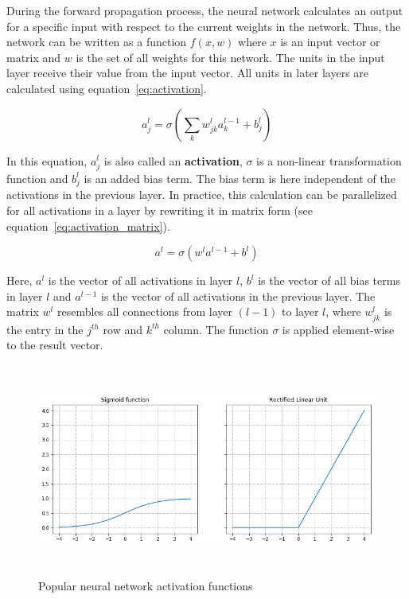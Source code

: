 During the forward propagation process, the neural network calculates an output
for a specific input with respect to the current weights in the network.
Thus, the network can be written as a function $f(x,w)$ where $x$ is an input
vector or matrix and $w$ is the set of all weights for this network.
The units in the input layer receive their value from the input vector.
All units in later layers are calculated using equation~\ref{eq:activation}.

\begin{equation}
  \label{eq:activation}
  a_j^l = \sigma(\sum_k w_{jk}^l a_k^{l-1} + b_j^l)
\end{equation}

In this equation, $a_j^l$ is also called an \textbf{activation}, $\sigma$ is a
non-linear transformation function and $b_j^l$ is an added bias term.
The bias term is here independent of the activations in the previous layer.
In practice, this calculation can be parallelized for all activations in a layer
by rewriting it in matrix form (see equation~\ref{eq:activation_matrix}).

\begin{equation}
  \label{eq:activation_matrix}
  a^l = \sigma(w^l a^{l-1} + b^l)
\end{equation}

Here, $a^l$ is the vector of all activations in layer $l$, $b^l$ is the vector
of all bias terms in layer $l$ and $a^{l-1}$ is the vector of all activations
in the previous layer. The matrix $w^l$ resembles all connections from layer $(l-1)$
to layer $l$, where $w^l_{jk}$ is the entry in the $j^{th}$ row and $k^{th}$ column.
The function $\sigma$ is applied element-wise to the result vector.

\begin{figure}[h]
  \includegraphics[height=7cm]{img/nn_activations}
  \caption{Popular neural network activation functions}
\label{fig:activations}
\end{figure}

